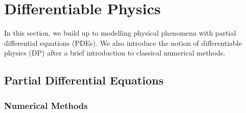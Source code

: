 \chapter{Differentiable Physics}
\label{sec:diffPhys}
In this section, we build up to modelling physical phenomena with partial
differential equations (PDEs). We also introduce the notion of differentiable
physics (DP) after a brief introduction to classical numerical methods.

\section{Partial Differential Equations}
\subsection{Numerical Methods}

